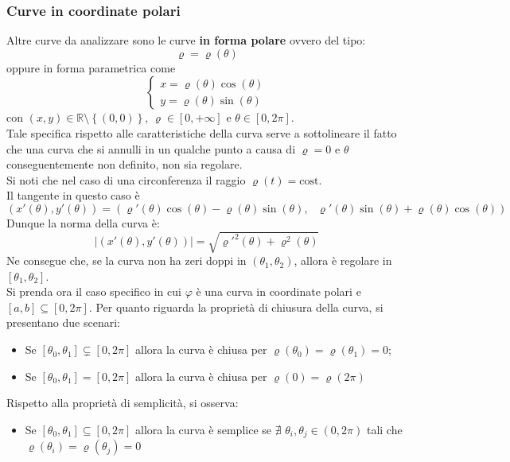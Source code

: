 \subsubsection{Curve in coordinate polari}
    Altre curve da analizzare sono le curve \textbf{in forma polare} ovvero del tipo:
    \begin{equation}
        \varrho=\varrho(\theta) 
    \end{equation}
    oppure in forma parametrica come 
    \begin{equation}
        \begin{cases}
            x=\varrho(\theta)\cos(\theta)\\
            y=\varrho(\theta)\sin(\theta)
        \end{cases}
    \end{equation}
    con $(x,y) \in \mathbb{R}\setminus \left\{(0,0)\right\}$, $\varrho \in \left[0, +\infty\right]$ e $\theta \in \left[0, 2\pi\right]$.\\
    Tale specifica rispetto alle caratteristiche della curva serve a sottolineare il fatto che una curva che si annulli in un qualche punto a causa di $\varrho=0$ e $\theta$ conseguentemente non definito, non sia regolare.\\
    Si noti che nel caso di una circonferenza il raggio $\varrho(t)=\text{cost}$.\\
    Il tangente in questo caso è
    \begin{equation}
        (x'(\theta), y'(\theta))=(\varrho'(\theta)\cos(\theta)-\varrho(\theta)\sin(\theta), \text{ } \varrho'(\theta)\sin(\theta)+\varrho(\theta)\cos(\theta))
    \end{equation}
    Dunque la norma della curva è:
    \begin{equation}
        |(x'(\theta), y'(\theta))|=\sqrt{\varrho'^2(\theta)+\varrho^2(\theta)}
    \end{equation} 
    Ne consegue che, se la curva non ha zeri doppi in $\left(\theta_1, \theta_2\right)$, allora è regolare in $\left[\theta_1, \theta_2\right]$.\\
    Si prenda ora il caso specifico in cui $\varphi$ è una curva in coordinate polari e $[a,b] \subseteq [0, 2\pi]$.
    Per quanto riguarda la proprietà di chiusura della curva, si presentano due scenari: 
    \begin{itemize}
        \item Se $[\theta_0, \theta_1] \subsetneq [0, 2\pi]$ allora la curva è chiusa per $\varrho(\theta_0)=\varrho(\theta_1)=0$;
        \item Se $[\theta_0, \theta_1]=[0, 2\pi]$ allora la curva è chiusa per $\varrho(0)=\varrho(2\pi)$
    \end{itemize}
    Rispetto alla proprietà di semplicità, si osserva:
    \begin{itemize}
        \item Se $[\theta_0, \theta_1] \subseteq [0, 2\pi]$ allora la curva è semplice se $\nexists$ $\theta_i, \theta_j \in (0,2\pi)$ tali che $\varrho(\theta_i)=\varrho(\theta_j)=0$
    \end{itemize}
\newpage
